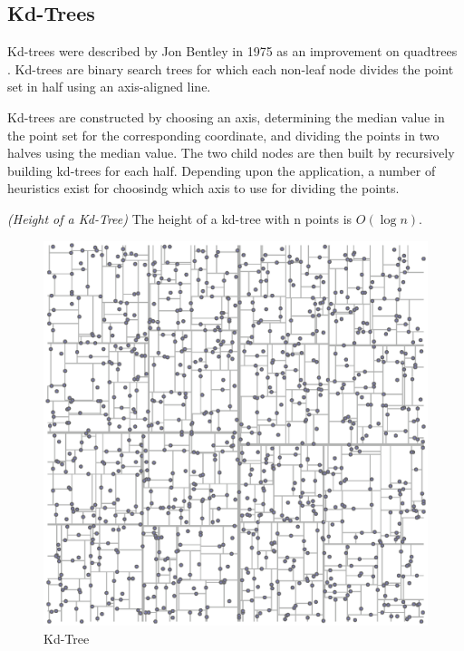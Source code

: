 \documentclass[mcs]{scsthesis}
\begin{document}
\subsection{Kd-Trees}

Kd-trees were described by Jon Bentley in 1975 as an improvement on quadtrees
\cite{kdtree}.  Kd-trees are binary search trees for which each non-leaf node
divides the point set in half using an axis-aligned line.

Kd-trees are constructed by choosing an axis, determining the median value in
the point set for the corresponding coordinate, and dividing the points in two
halves using the median value.  The two child nodes are then built by
recursively building kd-trees for each half.  Depending upon the application,
a number of heuristics exist for choosindg which axis to use for dividing the
points.

\begin{thm} \emph{(Height of a Kd-Tree)}
The height of a kd-tree with n points is \(O(\log n)\).
\end{thm}

\begin{figure}
\begin{center}
\includegraphics[scale=0.5]{diagrams/kdtree.eps}
\caption{Kd-Tree}
\end{center}
\end{figure}
\end{document}
